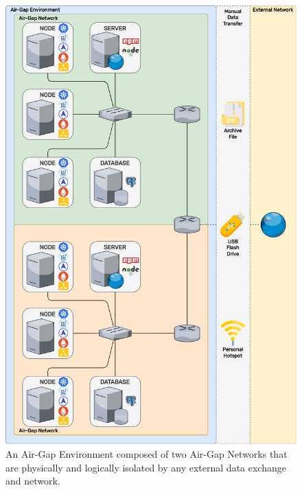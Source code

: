 \begin{figure}
  \centering
  \includegraphics[width=.5\textwidth]{images/recluster/airgap.png}
  \caption{An
  Air-Gap
  Environment
  composed
  of
  two
  Air-Gap
  Networks
  that
  are
  physically
  and
  logically
  isolated
  by
  any
  external
  data
  exchange
  and
  network.}
  \label{fig:airgap}
\end{figure}

